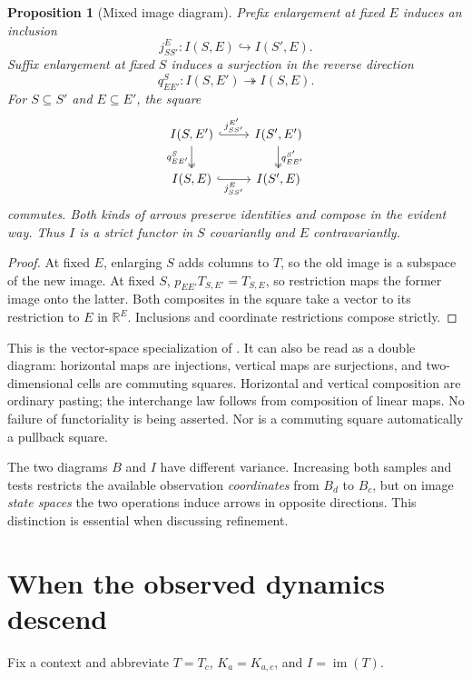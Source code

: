 \documentclass[11pt]{article}
\newtheorem{proposition}[theorem]{Proposition}
\theoremstyle{definition}
\newcommand{\R}{\mathbb R}
\newcommand{\im}{\operatorname{im}}
\begin{document}
\begin{proposition}[Mixed image diagram]\label{prop:mixed}
Prefix enlargement at fixed $E$ induces an inclusion
\[
j_{SS'}^E:I(S,E)\hookrightarrow I(S',E).
\]
Suffix enlargement at fixed $S$ induces a surjection in the reverse direction
\[
q_{EE'}^S:I(S,E')\twoheadrightarrow I(S,E).
\]
For $S\subseteq S'$ and $E\subseteq E'$, the square
\[
\begin{tikzcd}
I(S,E')\arrow[r,hook,"j_{SS'}^{E'}"]\arrow[d,two heads,"q_{EE'}^S"']&
I(S',E')\arrow[d,two heads,"q_{EE'}^{S'}"]\\
I(S,E)\arrow[r,hook,"j_{SS'}^E"']&I(S',E)
\end{tikzcd}
\]
commutes. Both kinds of arrows preserve identities and compose in the evident
way. Thus $I$ is a strict functor in $S$ covariantly and $E$ contravariantly.
\end{proposition}
\begin{proof}
At fixed $E$, enlarging $S$ adds columns to $T$, so the old image is a subspace
of the new image. At fixed $S$,
$p_{EE'}T_{S,E'}=T_{S,E}$, so restriction maps the former image onto the latter.
Both composites in the square take a vector to its restriction to $E$ in
$\R^E$. Inclusions and coordinate restrictions compose strictly.
\end{proof}

This is the vector-space specialization of \cite[Definition 29 and Lemma
31]{cps}. It can also be read as a double diagram: horizontal maps are
injections, vertical maps are surjections, and two-dimensional cells are
commuting squares. Horizontal and vertical composition are ordinary pasting;
the interchange law follows from composition of linear maps. No failure of
functoriality is being asserted. Nor is a commuting square automatically a
pullback square.

The two diagrams $B$ and $I$ have different variance. Increasing both samples
and tests restricts the available observation \emph{coordinates} from $B_d$ to
$B_c$, but on image \emph{state spaces} the two operations induce arrows in
opposite directions. This distinction is essential when discussing refinement.

\section{When the observed dynamics descend}

Fix a context and abbreviate $T=T_c$, $K_a=K_{a,c}$, and $I=\im(T)$.
\end{document}

